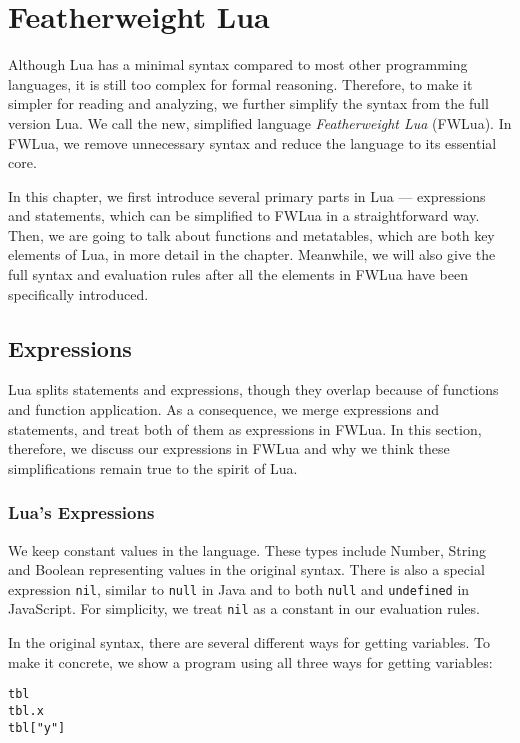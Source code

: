 \chapter{Featherweight Lua}
Although Lua has a minimal syntax compared to most other programming languages, it is still too complex for formal reasoning. Therefore, to make it simpler for reading and analyzing, we further simplify the syntax from the full version Lua. We call the new, simplified language {\it Featherweight Lua} (FWLua). In FWLua, we remove unnecessary syntax and reduce the language to its essential core.

In this chapter, we first introduce several primary parts in Lua --- expressions and statements, which can be simplified to FWLua in a straightforward way. Then, we are going to talk about functions and metatables, which are both key elements of Lua, in more detail in the chapter. Meanwhile, we will also give the full syntax and evaluation rules after all the elements in FWLua have been specifically introduced.

\section{Expressions}
Lua splits statements and expressions, though they overlap because of functions and function application. As a consequence, we merge expressions and statements, and treat both of them as expressions in FWLua. In this section, therefore, we discuss our expressions in FWLua and why we think these simplifications remain true to the spirit of Lua. 

\subsection{Lua's Expressions}

We keep constant values in the language.
These types include Number, String and Boolean representing values in the original syntax.
There is also a special expression {\tt nil}, similar to {\tt null} in Java and to both {\tt null} and {\tt undefined} in JavaScript.
For simplicity, we treat {\tt nil} as a constant in our evaluation rules.

In the original syntax,
there are several different ways for getting variables.
To make it concrete, we show a program using all three ways for getting variables:

\begin{verbatim}
tbl
tbl.x
tbl["y"]
\end{verbatim}


